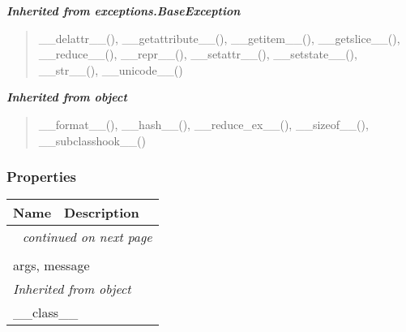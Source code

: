 \large{\textbf{\textit{Inherited from exceptions.BaseException}}}

\begin{quote}
\_\_delattr\_\_(), \_\_getattribute\_\_(), \_\_getitem\_\_(), \_\_getslice\_\_(), \_\_reduce\_\_(), \_\_repr\_\_(), \_\_setattr\_\_(), \_\_setstate\_\_(), \_\_str\_\_(), \_\_unicode\_\_()
\end{quote}

\large{\textbf{\textit{Inherited from object}}}

\begin{quote}
\_\_format\_\_(), \_\_hash\_\_(), \_\_reduce\_ex\_\_(), \_\_sizeof\_\_(), \_\_subclasshook\_\_()
\end{quote}


  \subsubsection{Properties}

    \vspace{-1cm}
\hspace{\varindent}\begin{longtable}{|p{\varnamewidth}|p{\vardescrwidth}|l}
\cline{1-2}
\cline{1-2} \centering \textbf{Name} & \centering \textbf{Description}& \\
\cline{1-2}
\endhead\cline{1-2}\multicolumn{3}{r}{\small\textit{continued on next page}}\\\endfoot\cline{1-2}
\endlastfoot\multicolumn{2}{|l|}{\textit{Inherited from exceptions.BaseException}}\\
\multicolumn{2}{|p{\varwidth}|}{\raggedright args, message}\\
\cline{1-2}
\multicolumn{2}{|l|}{\textit{Inherited from object}}\\
\multicolumn{2}{|p{\varwidth}|}{\raggedright \_\_class\_\_}\\
\cline{1-2}
\end{longtable}



